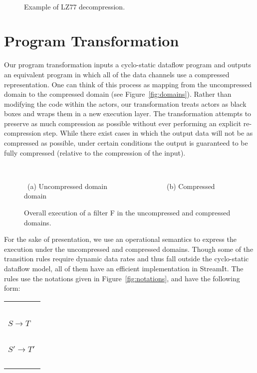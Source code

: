 \begin{figure}[t]
\begin{minipage}{0.21in}
\mbox{~}
\end{minipage}
\caption{Example of LZ77 decompression.
\protect\label{fig:lz77}}
\end{figure}

\section{Program Transformation}

Our program transformation inputs a cyclo-static dataflow program and
outputs an equivalent program in which all of the data channels use a
compressed representation.  One can think of this process as mapping
from the uncompressed domain to the compressed domain (see
Figure~\ref{fig:domains}).  Rather than modifying the code within the
actors, our transformation treats actors as black boxes and wraps them
in a new execution layer.  The transformation attempts to preserve as
much compression as possible without ever performing an explicit
re-compression step.  While there exist cases in which the output data
will not be as compressed as possible, under certain conditions the
output is guaranteed to be fully compressed (relative to the
compression of the input).

\begin{figure}[t]
~~~~~~~~~

\mbox{~}(a) Uncompressed domain~~~~~~~~~~~~~~~~~(b) Compressed domain
\caption{Overall execution of a filter F in the uncompressed and compressed domains.
\protect\label{fig:actor-pic}}
\end{figure}

For the sake of presentation, we use an operational semantics to
express the execution under the uncompressed and compressed domains.
Though some of the transition rules require dynamic data rates and
thus fall outside the cyclo-static dataflow model, all of them have an
efficient implementation in StreamIt.  The rules use the notations
given in Figure~\ref{fig:notations}, and have the following form:

\hspace{-12pt}\begin{tabular}{l} ~ \vspace{-6pt} \\ 
\hspace{-3pt}$S \rightarrow T$ \hspace{-7pt}~\vspace{0.5pt} \\ \hline ~ \vspace{-7.5pt} \\
\hspace{-3pt}$S' \rightarrow T'$ \hspace{-7pt} \\ ~ \vspace{-6pt} \\
\end{tabular}

